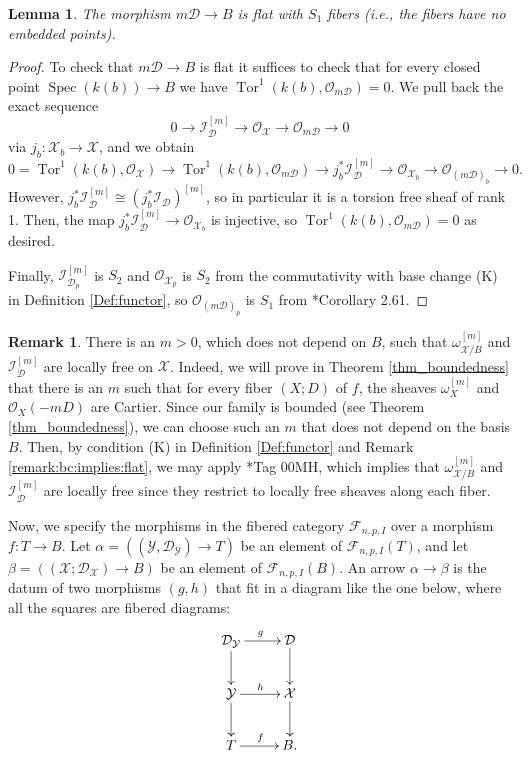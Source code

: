 \documentclass{amsart}
\newcommand{\sF}{\mathscr{F}}
\newcommand{\cD}{\mathcal{D}}
\newcommand{\cI}{\mathcal{I}}
\newcommand{\cO}{\mathcal{O}}
\newcommand{\cX}{\mathcal{X}}
\newcommand{\cY}{\mathcal{Y}}
\newcommand{\spec}{\operatorname{Spec}}
\newtheorem{Lemma}[theorem]{Lemma}
\theoremstyle{definition}
\newtheorem{Remark}[theorem]{Remark}
\begin{document}
\begin{Lemma}
The morphism $m\cD\to B$ is flat with $S_1$ fibers (i.e., the fibers have no embedded points).\end{Lemma}
\begin{proof}
To check that $m\cD\to B$ is flat it suffices to check that for every closed point $\spec(k(b))\to B$ we have $\operatorname{Tor}^1(k(b),\cO_{m\cD}) = 0$. We pull back the exact sequence
\[
0\to \cI_{\cD}^{[m]}\to \cO_{\cX} \to \cO_{m\cD}\to 0
\]
via $j_{b} \colon \cX_b\to \cX$, and we obtain
\[
0 = \operatorname{Tor}^1(k(b),\cO_{\cX}) \to \operatorname{Tor}^1(k(b),\cO_{m\cD}) \to j_{b}^*\cI_{\cD}^{[m]}\to \cO_{\cX_{b}} \to \cO_{(m\cD)_{b}}\to 0.
\]
However, $j_{b}^*\cI_{\cD}^{[m]} \cong (j_{b}^*\cI_{\cD})^{[m]}$, so in particular it is a torsion free sheaf of rank 1.
Then, the map $j_{b}^*\cI_{\cD}^{[m]}\to \cO_{\cX_{b}}$ is injective, so $\operatorname{Tor}^1(k(b),\cO_{m\cD})=0$ as desired.

Finally, $\cI_{\cD_p}^{[m]}$ is $S_2$ and $\cO_{\cX_p}$ is $S_2$ from the commutativity with base change (K) in Definition \ref{Def:functor}, so $\cO_{(m\cD)_p}$ is $S_1$ from \cite{Kol13}*{Corollary 2.61}.\end{proof}

\begin{Remark}\label{remark_for_m_big_enough_kollar_comndition_guarantees_cartier}
There is an $m>0$, which does not depend on $B$, such that $\omega_{\cX/B}^{[m]}$ and $\cI_\cD^{[m]}$ are locally free on $\cX$.
Indeed, we will prove in Theorem \ref{thm_boundedness} that there is an $m$ such that for every fiber $(X;D)$ of $f$, the sheaves $\omega_X^{[m]}$ and $\cO_X(-mD)$ are Cartier.
Since our family is bounded (see Theorem \ref{thm_boundedness}), we can choose such an $m$ that does not depend on the basis $B$.
Then, by condition (K) in Definition \ref{Def:functor} and Remark \ref{remark:bc:implies:flat}, we may apply  \cite{stacks-project}*{Tag 00MH}, which implies that $\omega_{\cX/B}^{[m]}$ and $\cI_\cD^{[m]}$ are locally free since they restrict to locally free sheaves along each fiber.
\end{Remark}

Now, we specify the morphisms in the fibered category $\sF_{n,p,I}$ over a morphism $f \colon T\to B.$
Let $\alpha = ((\cY,\cD_\cY)\to T)$ be an element of $\sF_{n,p,I}(T)$, and let $\beta = ((\cX;\cD_\cX)\to B)$ be an element of $\sF_{n,p,I}(B)$.
An arrow $\alpha \to \beta$ is the datum of two morphisms $(g,h)$ that fit in a diagram like the one below, where all the squares are fibered diagrams:
\[
\xymatrix{\cD_\cY\ar[r]^g\ar[d] & \cD\ar[d] \\ \cY\ar[d] \ar[r]^h & \cX\ar[d] \\ T\ar[r]^f & B.}
\]
\end{document}

